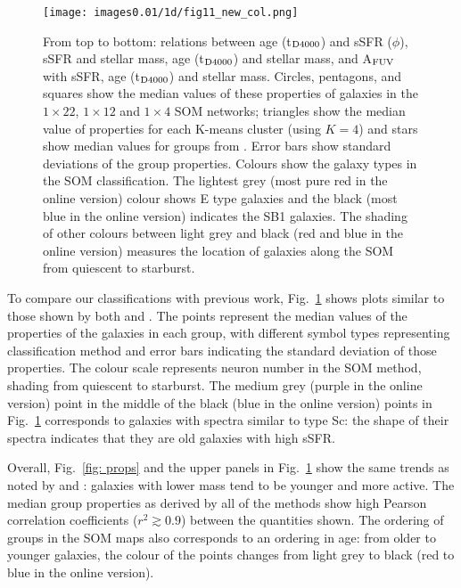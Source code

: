         \begin{figure}
\texttt{[image: images0.01/1d/fig11\_new\_col.png]}
        \caption{
        From top to bottom: relations between age (t$_{\rm {D4000}}$) and sSFR ($\phi$), sSFR and stellar mass, age (t$_{\rm {D4000}}$) and stellar mass, and A$_{\rm {FUV}}$ with sSFR, age (t$_{\rm {D4000}}$) and stellar mass. 
        Circles, pentagons, and squares show the median values of these properties of galaxies in the $1\times22$, $1\times 12$ and $1\times4$ SOM networks; 
        triangles show the median value of properties for each K-means cluster (using $K=4$) and stars show median values for groups from .
        Error bars show standard deviations of the group properties.
        Colours show the galaxy types in the SOM classification. 
        The lightest grey (most pure red in the online version) colour shows E type galaxies and the black (most blue in the online version) indicates the SB1 galaxies. 
        The shading of other colours between light grey and black (red and blue in the online version) measures the location of galaxies along the SOM from  quiescent to starburst.}
        \label{fig: props_vs_props}
        \end{figure}
    
        To compare our classifications with previous work, Fig.~\ref{fig: props_vs_props} shows plots similar to those shown by both  and .
        The points represent the median values of the properties of the galaxies in each group, with different symbol types representing classification method and error bars indicating the standard deviation of those properties.
       The colour scale represents neuron number in the SOM method, shading from quiescent to starburst. 
        The medium grey (purple in the online version) point in the middle of the black (blue in the online version) points in Fig.~\ref{fig: props_vs_props} corresponds to galaxies with spectra similar to type Sc: the shape of their spectra indicates that they are old galaxies with high sSFR.
        
        Overall, Fig.~\ref{fig: props} and the upper panels in Fig.~\ref{fig: props_vs_props} show the same trends as noted by  and :
        galaxies with lower mass tend to be younger and more active.
        The median group properties as derived by all of the methods show high Pearson correlation coefficients ($r^2\gtrsim 0.9$) between the quantities shown.
        The ordering of groups in the SOM maps also corresponds to an ordering in age:    
        from older to younger galaxies, the colour of the points changes from light grey to black (red to blue in the online version).
        
